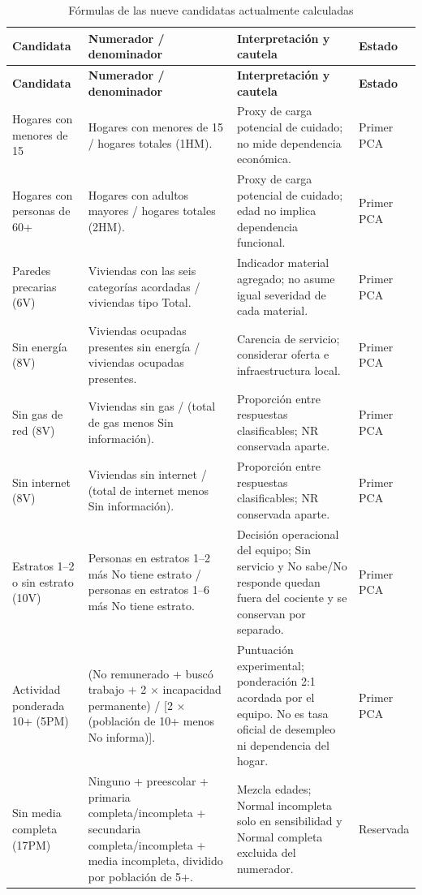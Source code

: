 \begin{singlespace}
\small
\begin{longtable}{@{}p{}p{}p{}p{}@{}}
\caption{Fórmulas de las nueve candidatas actualmente calculadas}\label{tab:formulas_candidatas}\\
\toprule
\textbf{Candidata} & \textbf{Numerador / denominador} & \textbf{Interpretación y cautela} & \textbf{Estado}\\
\midrule
\endfirsthead
\toprule
\textbf{Candidata} & \textbf{Numerador / denominador} & \textbf{Interpretación y cautela} & \textbf{Estado}\\
\midrule
\endhead
Hogares con menores de 15 & Hogares con menores de 15 / hogares totales (1HM). & Proxy de carga potencial de cuidado; no mide dependencia económica. & Primer PCA \\
Hogares con personas de 60+ & Hogares con adultos mayores / hogares totales (2HM). & Proxy de carga potencial de cuidado; edad no implica dependencia funcional. & Primer PCA \\
Paredes precarias (6V) & Viviendas con las seis categorías acordadas / viviendas tipo Total. & Indicador material agregado; no asume igual severidad de cada material. & Primer PCA \\
Sin energía (8V) & Viviendas ocupadas presentes sin energía / viviendas ocupadas presentes. & Carencia de servicio; considerar oferta e infraestructura local. & Primer PCA \\
Sin gas de red (8V) & Viviendas sin gas / (total de gas menos Sin información). & Proporción entre respuestas clasificables; NR conservada aparte. & Primer PCA \\
Sin internet (8V) & Viviendas sin internet / (total de internet menos Sin información). & Proporción entre respuestas clasificables; NR conservada aparte. & Primer PCA \\
Estratos 1--2 o sin estrato (10V) & Personas en estratos 1--2 más No tiene estrato / personas en estratos 1--6 más No tiene estrato. & Decisión operacional del equipo; Sin servicio y No sabe/No responde quedan fuera del cociente y se conservan por separado. & Primer PCA \\
Actividad ponderada 10+ (5PM) & (No remunerado + buscó trabajo + 2 $\times$ incapacidad permanente) / [2 $\times$ (población de 10+ menos No informa)]. & Puntuación experimental; ponderación 2:1 acordada por el equipo. No es tasa oficial de desempleo ni dependencia del hogar. & Primer PCA \\
Sin media completa (17PM) & Ninguno + preescolar + primaria completa/incompleta + secundaria completa/incompleta + media incompleta, dividido por población de 5+. & Mezcla edades; Normal incompleta solo en sensibilidad y Normal completa excluida del numerador. & Reservada \\
\bottomrule
\end{longtable}
\normalsize
\end{singlespace}


